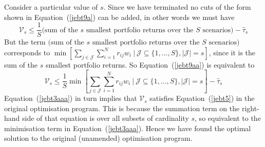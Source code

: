 Consider a particular value of $s$. Since we have terminated no cuts of the form shown in 
Equation~(\ref{jebt9a}) can be added, in other words we must have
\begin{equation}
\mathcal{V}_s \leq \frac{1}{S} \text{(sum of the $s$ smallest portfolio returns over the $S$ scenarios)} - \hat{\tau}_s
\label{jebt9aa}
\end{equation}
But the term $\text{(sum of the $s$ smallest portfolio returns over the $S$ scenarios)}$ corresponds to $\min [ \sum_{j \in \mathcal{J}} \sum_{i = 1}^N r_{ij} w_i~|~\mathcal{J} \subseteq \{1, ..., S\}, |\mathcal{J}| = s ]$, since it is the sum of the $s$ smallest portfolio returns. So Equation~(\ref{jebt9aa}) is equivalent to
\begin{equation} 
\mathcal{V}_s \leq \frac{1}{S} \min \left[ \sum_{j \in \mathcal{J}} \sum_{i = 1}^N r_{ij} w_i~|~\mathcal{J} \subseteq \{1, ..., S\}, |\mathcal{J}| = s \right] - \hat{\tau}_s
\label{jebt3aaa}
\end{equation}
Equation~(\ref{jebt3aaa})  in turn implies that $\mathcal{V}_s$ satisfies Equation~(\ref{jebt5}) in the original optimisation program. This is because the summation term on 
the right-hand side of that equation is over all subsets of cardinality $s$, so equivalent to the minimisation term in Equation~(\ref{jebt3aaa}).
Hence we have found the optimal solution to the original (unamended) optimisation program.


\begin{comment}
Consider a particular value of $s$. 
Here, since we have terminated, we must 
some scenario set $k \in \mathcal{J^*}$ corresponding to the $s$ smallest portfolio returns associated with the current solution.  As a consequence there can be no other scenario set of cardinality $s$ for which the sum of the $s$ smallest portfolio returns is less than that associated with $k$. 
Hence we have found the optimal solution to the original (unamended) optimisation program.
\end{comment}

\begin{comment}
At termination at Step (3) above we will have a set of values satisfying all constraints. It remains to prove that there is no better set of values (i.e.~a different set of values which can improve upon the objective function). The proof is by contradiction. We have a feasible set of values for a subset $\mathcal{J^*}$ of all possible scenario sets $\forall \mathcal{J} \subseteq \{1, ..., S\}, |\mathcal{J}| = s, s=1,\ldots,S$. Adding any sets missing from $\mathcal{J^*}$ cannot improve the objective function value as additional constraints can only decrease, or leave unchanged, the objective function value.
\end{comment}

